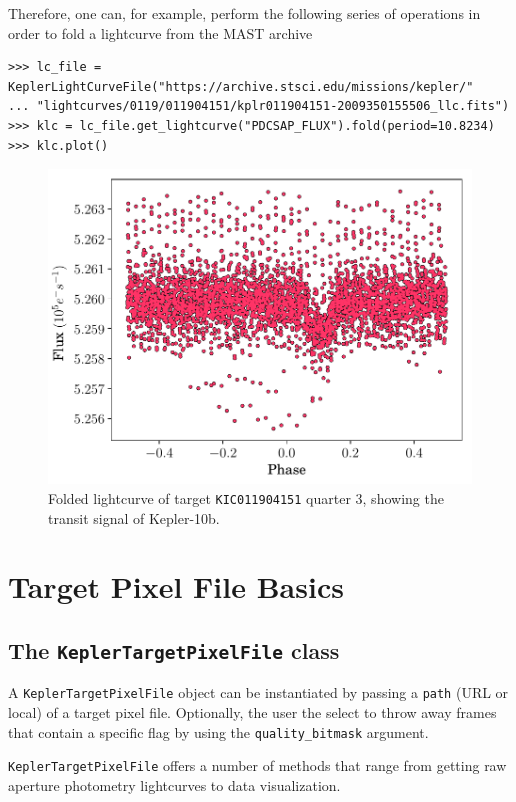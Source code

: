 \documentclass{article}
\begin{document}
        Therefore, one can, for example, perform the following series of operations
        in order to fold a lightcurve from the MAST archive
\begin{verbatim}
>>> lc_file = KeplerLightCurveFile("https://archive.stsci.edu/missions/kepler/"
... "lightcurves/0119/011904151/kplr011904151-2009350155506_llc.fits")
>>> klc = lc_file.get_lightcurve("PDCSAP_FLUX").fold(period=10.8234)
>>> klc.plot()
\end{verbatim}
        \begin{figure}[!htb]
            \centering
            \includegraphics[scale=.5]{figs/fold-lc.pdf}
            \caption{Folded lightcurve of target \texttt{KIC011904151} quarter 3, showing the
            transit signal of Kepler-10b.}
            \label{fig:fold-method}
        \end{figure}

\section{Target Pixel File Basics}
    \subsection{The \texttt{KeplerTargetPixelFile} class}
        A \texttt{KeplerTargetPixelFile} object can be instantiated
        by passing a \texttt{path} (URL or local) of a target pixel file.
        Optionally, the user the select to throw away frames that contain
        a specific flag by using the \texttt{quality\_bitmask} argument.

        \texttt{KeplerTargetPixelFile} offers a number of methods
        that range from getting raw aperture photometry lightcurves to
        data visualization.
\end{document}

